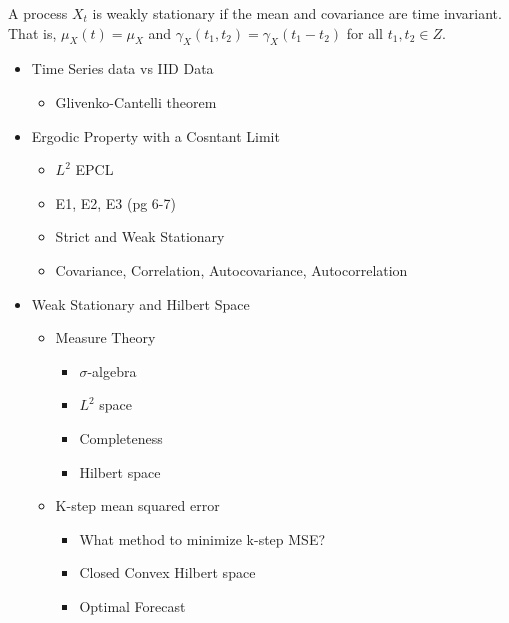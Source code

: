 \documentclass[answers,12pt,addpoints]{exam}
\begin{document}
    
\begin{definition}
    A process $X_t$ is weakly stationary if the mean and covariance are time invariant. That is, $\mu_X(t) = \mu_X$ and $\gamma_X(t_1, t_2) = \gamma_X(t_1 - t_2)$ for all $t_1, t_2 \in Z$.
\end{definition}
\begin{definition}
    
\end{definition}
\begin{definition}
    
\end{definition}
\newpage
\begin{itemize}
    \item Time Series data vs IID Data
    \begin{itemize}
        \item Glivenko-Cantelli theorem
    \end{itemize}
    \item Ergodic Property with a Cosntant Limit
    \begin{itemize}
        \item $L^2$ EPCL
        \item E1, E2, E3 (pg 6-7)
        \item Strict and Weak Stationary
        \item Covariance, Correlation, Autocovariance, Autocorrelation
    \end{itemize}
    \item Weak Stationary and Hilbert Space
    \begin{itemize}
        \item Measure Theory 
        \begin{itemize}
            \item $\sigma$-algebra
            \item $L^2$ space
            \item Completeness 
            \item Hilbert space 
        \end{itemize}
        \item K-step mean squared error
        \begin{itemize}
            \item What method to minimize k-step MSE?
            \item Closed Convex Hilbert space
            \item Optimal Forecast

\end{itemize}
\end{itemize}
\end{itemize}
\end{document}
